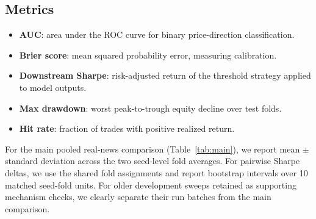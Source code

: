 \subsection{Metrics}
\begin{itemize}
  \item \textbf{AUC}: area under the ROC curve for binary price-direction classification.
  \item \textbf{Brier score}: mean squared probability error, measuring calibration.
  \item \textbf{Downstream Sharpe}: risk-adjusted return of the threshold strategy applied to model outputs.
  \item \textbf{Max drawdown}: worst peak-to-trough equity decline over test folds.
  \item \textbf{Hit rate}: fraction of trades with positive realized return.
\end{itemize}
For the main pooled real-news comparison (Table~\ref{tab:main}), we report mean $\pm$ standard deviation across the two seed-level fold averages.
For pairwise Sharpe deltas, we use the shared fold assignments and report bootstrap intervals over 10 matched seed-fold units.
For older development sweeps retained as supporting mechanism checks, we clearly separate their run batches from the main comparison.
